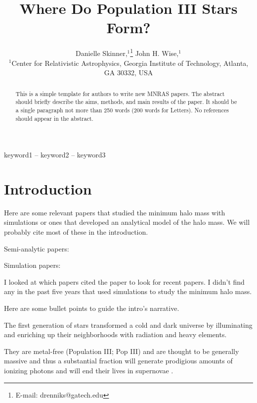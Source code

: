 \documentclass[a4paper,fleqn,usenatbib]{mnras}
\title[Where Do Pop III Stars Form?]{Where Do Population III Stars Form?}
\author[Danielle Skinner et al.]{
Danielle Skinner,$^{1}$\thanks{E-mail: drenniks@gatech.edu}
John H. Wise,$^{1}$
\\
$^{1}$Center for Relativistic Astrophysics, Georgia Institute of Technology, 
Atlanta, GA 30332, USA\\
}
\begin{document}
\label{firstpage}
\pagerange{\pageref{firstpage}--\pageref{lastpage}}
\maketitle

\begin{abstract}
This is a simple template for authors to write new MNRAS papers.
The abstract should briefly describe the aims, methods, and main results of the 
paper.
It should be a single paragraph not more than 250 words (200 words for Letters).
No references should appear in the abstract.
\end{abstract}

\begin{keywords}
keyword1 -- keyword2 -- keyword3
\end{keywords}



\section{Introduction}

\noindent Here are some relevant papers that studied the minimum halo
mass with simulations or ones that developed an analytical model of
the halo mass.  We will probably cite most of these in the
introduction.

\lli Semi-analytic papers: \citep{Tegmark97, Trenti09, Visbal18,
  Mebane18, Griffen18}

\lli Simulation papers: \citep{Machacek01, Yoshida03, Wise07_UVB,
  OShea08, Muratov13}

 I looked at which papers cited the \citet{Machacek01}
paper to look for recent papers.  I didn't find any in the past five
years that used simulations to study the minimum halo mass.

\medskip
\noindent Here are some bullet points to guide the intro's narrative.

\li The first generation of stars transformed a cold and dark universe
by illuminating and enriching up their neighborhoods with radiation
and heavy elements.

\li They are metal-free (Population III; Pop III) and are thought to
be generally massive and thus a substantial fraction will generate
prodigious amounts of ionizing photons and will end their lives in
supernovae \citep[e.g.][]{Schaerer02, Heger02}.
\end{document}
